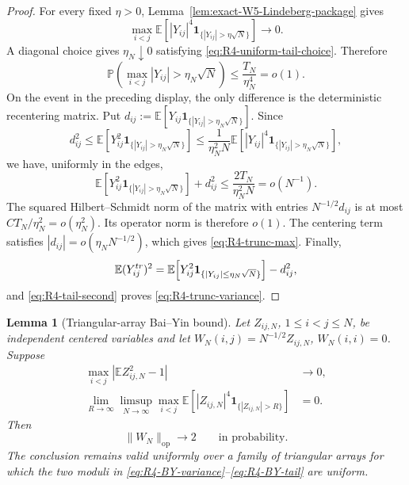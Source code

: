 \documentclass[10pt,a4paper]{amsart}
\newtheorem{lemma}[theorem]{Lemma}
\newcommand{\E}{\mathbb E}
\newcommand{\op}{\mathrm{op}}
\newcommand{\one}{\mathbf 1}
\newcommand{\norm}[1]{\lVert #1\rVert}
\begin{document}
\begin{proof}
For every fixed \(\eta>0\),
Lemma~\ref{lem:exact-W5-Lindeberg-package} gives
\[
 \max_{i<j}
 \E\!\left[|Y_{ij}|^4
 \one_{\{|Y_{ij}|>\eta\sqrt N\}}\right]\longrightarrow0.
\]
A diagonal choice gives \(\eta_N\downarrow0\) satisfying
\eqref{eq:R4-uniform-tail-choice}.  Therefore
\[
 \mathbb P\!\left(\max_{i<j}|Y_{ij}|>\eta_N\sqrt N\right)
 \le \frac{T_N}{\eta_N^4}=o(1).
\]
On the event in the preceding display, the only difference is the
deterministic recentering matrix.  Put
\(d_{ij}:=\E[Y_{ij}\one_{\{|Y_{ij}|>\eta_N\sqrt N\}}]\).  Since
\[
 d_{ij}^2
 \le \E\!\left[Y_{ij}^2
       \one_{\{|Y_{ij}|>\eta_N\sqrt N\}}\right]
 \le \frac{1}{\eta_N^2N}
 \E\!\left[|Y_{ij}|^4
       \one_{\{|Y_{ij}|>\eta_N\sqrt N\}}\right],
\]
we have, uniformly in the edges,
\begin{equation}\label{eq:R4-tail-second}
 \E\!\left[Y_{ij}^2
 \one_{\{|Y_{ij}|>\eta_N\sqrt N\}}\right]
 +d_{ij}^2
 \le \frac{2T_N}{\eta_N^2N}
 =o(N^{-1}).
\end{equation}
The squared Hilbert--Schmidt norm of the matrix with entries
\(N^{-1/2}d_{ij}\) is at most
\(C T_N/\eta_N^2=o(\eta_N^2)\).  Its operator norm is therefore \(o(1)\).
The centering term satisfies
\(|d_{ij}|=o(\eta_NN^{-1/2})\), which gives
\eqref{eq:R4-trunc-max}.  Finally,
\[
 \E(Y_{ij}^{\rm tr})^2
 =\E\!\left[Y_{ij}^2
       \one_{\{|Y_{ij}|\le\eta_N\sqrt N\}}\right]-d_{ij}^2,
\]
and \eqref{eq:R4-tail-second} proves
\eqref{eq:R4-trunc-variance}.
\end{proof}

\begin{lemma}[Triangular-array Bai--Yin bound]
\label{lem:R4-triangular-Bai-Yin}
Let \(Z_{ij,N}\), \(1\le i<j\le N\), be independent centered variables and
let \(W_N(i,j)=N^{-1/2}Z_{ij,N}\), \(W_N(i,i)=0\).  Suppose
\begin{align}
 \max_{i<j}\left|\E Z_{ij,N}^2-1\right|&\longrightarrow0,
 \label{eq:R4-BY-variance}\\
 \lim_{R\to\infty}\limsup_{N\to\infty}
 \max_{i<j}
 \E\!\left[|Z_{ij,N}|^4
 \one_{\{|Z_{ij,N}|>R\}}\right]&=0.
 \label{eq:R4-BY-tail}
\end{align}
Then
\begin{equation}\label{eq:R4-BY-conclusion}
 \norm{W_N}_{\op}\longrightarrow2
 \qquad\text{in probability}.
\end{equation}
The conclusion remains valid uniformly over a family of triangular arrays
for which the two moduli in
\eqref{eq:R4-BY-variance}--\eqref{eq:R4-BY-tail} are uniform.
\end{lemma}
\end{document}
